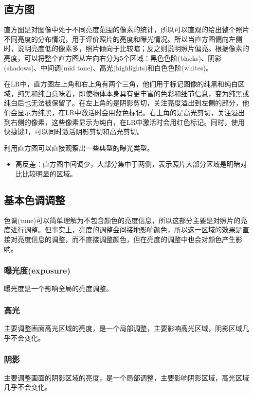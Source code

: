 \documentclass{ctexart}
\begin{document}
\subsection{直方图}
直方图是对图像中处于不同亮度范围的像素的统计，所以可以直观的给出整个照片不同亮度的分布情况，用于评价照片的亮度和曝光情况。所以当直方图偏向左侧时，说明亮度低的像素多，照片倾向于比较暗；反之则说明照片偏亮。根据像素的亮度，可以将整个直方图从左向右分为5个区域：黑色色阶(blacks)、阴影(shadows)、中间调(mid tone)、高光(highlights)和白色色阶(whites)。

在LR中，直方图左上角和右上角有两个三角，他们用于标记图像的纯黑和纯白区域，纯黑和纯白意味着，即使物体本身具有更丰富的色彩和细节信息，变为纯黑或纯白后也无法被保留了。在左上角的是阴影剪切，关注亮度溢出到左侧的部分，他们会显示为纯黑，在LR中激活时会用蓝色标记。右上角的是高光剪切，关注溢出到右侧的像素，这些像素显示为纯白，在LR中激活时会用红色标记。同时，使用快捷键J，可以同时激活阴影剪切和高光剪切。

利用直方图可以直接观察出一些典型的曝光类型。
\begin{itemize}
    \item 高反差：直方图中间调少，大部分集中于两侧，表示照片大部分区域是明暗对比比较明显的区域。
\end{itemize}

\subsection{基本色调调整}
色调(tune)可以简单理解为不包含颜色的亮度信息，所以这部分主要是对照片的亮度进行调整。但事实上，亮度的调整会间接地影响颜色，所以这一区域的效果是直接对亮度信息的调整，而不直接调整颜色，但在亮度的调整中也会对颜色产生影响。
\subsubsection{曝光度(exposure)}
曝光度是一个影响全局的亮度调整。

\subsubsection{高光}
主要调整画面高光区域的亮度，是一个局部调整，主要影响高光区域，阴影区域几乎不会变化。

\subsubsection{阴影}
主要调整画面的阴影区域的亮度，是一个局部调整，主要影响阴影区域，高光区域几乎不会变化。
\end{document}
